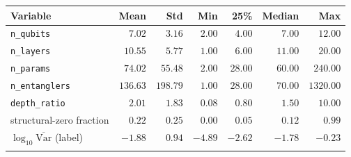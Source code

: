 \begin{tabular}{lrrrrrr}
\toprule
\textbf{Variable} & \textbf{Mean} & \textbf{Std} & \textbf{Min} & \textbf{25\%} & \textbf{Median} & \textbf{Max}\\
\midrule
\texttt{n\_qubits} & $7.02$ & $3.16$ & $2.00$ & $4.00$ & $7.00$ & $12.00$\\
\texttt{n\_layers} & $10.55$ & $5.77$ & $1.00$ & $6.00$ & $11.00$ & $20.00$\\
\texttt{n\_params} & $74.02$ & $55.48$ & $2.00$ & $28.00$ & $60.00$ & $240.00$\\
\texttt{n\_entanglers} & $136.63$ & $198.79$ & $1.00$ & $28.00$ & $70.00$ & $1320.00$\\
\texttt{depth\_ratio} & $2.01$ & $1.83$ & $0.08$ & $0.80$ & $1.50$ & $10.00$\\
structural-zero fraction & $0.22$ & $0.25$ & $0.00$ & $0.05$ & $0.12$ & $0.99$\\
$\log_{10}\overline{\mathrm{Var}}$ (label) & $-1.88$ & $0.94$ & $-4.89$ & $-2.62$ & $-1.78$ & $-0.23$\\
\botrule
\end{tabular}
